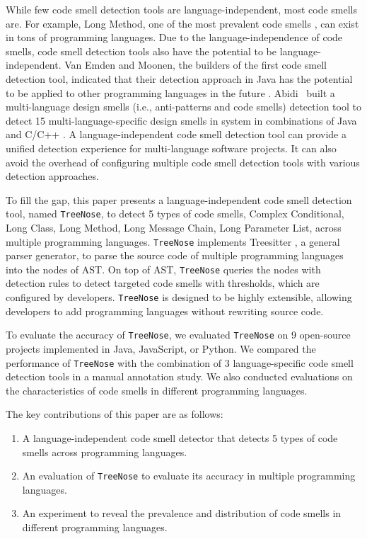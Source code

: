 While few code smell detection tools are language-independent, most code smells
are. For example, Long Method, one of the most prevalent code smells
\cite{developersCare}, can exist in tons of programming languages. Due to the
language-independence of code smells, code smell detection tools also have the
potential to be language-independent. Van Emden and Moonen, the builders of the
first code smell detection tool, indicated that their detection approach in Java
has the potential to be applied to other programming languages in the future
\cite{1173068}. Abidi~\etal{} built a multi-language design smells (i.e.,
anti-patterns and code smells) detection tool to detect 15
multi-language-specific design smells in system in combinations of Java and
C/C++ \cite{MultiLanguageCodeSmells,Fault-Prone}. A language-independent code
smell detection tool can provide a unified detection experience for
multi-language software projects. It can also avoid the overhead of configuring
multiple code smell detection tools with various detection approaches.

To fill the gap, this paper presents a language-independent code smell detection
tool, named \texttt{TreeNose}, to detect 5 types of code smells, Complex
Conditional, Long Class, Long Method, Long Message Chain, Long Parameter List,
across multiple programming languages. \texttt{TreeNose} implements Treesitter
\cite{treeSitter}, a general parser generator, to parse the source code of
multiple programming languages into the nodes of AST. On top of AST,
\texttt{TreeNose} queries the nodes with detection rules to detect targeted code
smells with thresholds, which are configured by developers. \texttt{TreeNose} is
designed to be highly extensible, allowing developers to add programming
languages without rewriting source code.

To evaluate the accuracy of \texttt{TreeNose}, we evaluated \texttt{TreeNose}
on 9 open-source projects implemented in Java, JavaScript, or Python.
We compared the performance of \texttt{TreeNose} with the combination of 3
language-specific code smell detection tools in a manual annotation study.
We also conducted evaluations on the characteristics of code smells in
different programming languages.

The key contributions of this paper are as follows:

\begin{enumerate}

    \item A language-independent code smell detector that detects 5 types of
        code smells across programming languages.

    \item An evaluation of \texttt{TreeNose} to evaluate its accuracy in
        multiple programming languages.

    \item An experiment to reveal the prevalence and distribution of code smells
        in different programming languages.

\end{enumerate}

